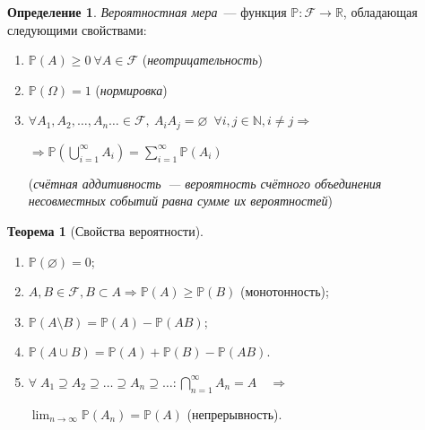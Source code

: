 \documentclass[oneside,final,14pt]{extreport}
\newcommand\myprob[1]{{\mathbb{P}(#1)}}
\theoremstyle{plain}
\theoremstyle{definition}
\newtheorem*{defn}{Определение}
\theoremstyle{named}
\newtheorem*{namedthm}{Теорема}
\begin{document}
\begin{defn}
    {\it Вероятностная мера}~--- функция $\mathbb{P}: \mathcal{F} \rightarrow \mathbb{R}$, обладающая следующими свойствами:

\begin{enumerate}
    \item $\myprob{A} \geqslant 0~\forall A \in \mathcal{F}$ ({\it неотрицательность})
    \item $\myprob{\Omega} = 1$ ({\it нормировка})
    \item $\forall A_1, A_2, \ldots, A_n\ldots \in \mathcal{F},~ A_{i}A_{j} = \varnothing~ \; \forall i, j \in \mathbb{N}, i \ne j \Rightarrow $
    
    $ \Rightarrow \myprob{\bigcup\limits_{i=1}^\infty A_i} = \sum\limits_{i=1}^\infty \myprob{A_i}$
    
    ({\it счётная аддитивность~--- вероятность счётного объединения несовместных событий равна сумме их вероятностей})
\end{enumerate}
\end{defn}

\begin{namedthm}[Свойства вероятности]\leavevmode
    \begin{enumerate}
       \item $\myprob{\varnothing}=0$;
        \item $A, B \in \mathcal{F}, B \subset A \Rightarrow \myprob{A} \geqslant \myprob{B}$ (монотонность);
       \item $\myprob{A \setminus B} = \myprob{A} - \myprob{AB}$;
       \item $\myprob{A \cup B} = \myprob{A} + \myprob{B} - \myprob{AB}$.
       \item $ \forall \; A_1 \supseteq A_2 \supseteq \ldots \supseteq A_n \supseteq \ldots \colon \bigcap\limits_{n = 1}^{\infty} A_n = A \quad \Rightarrow$
       
       $\displaystyle \lim_{n \to \infty}\myprob{A_n} = \myprob{A}$ (непрерывность).
    \end{enumerate}
\end{namedthm}
\end{document}
